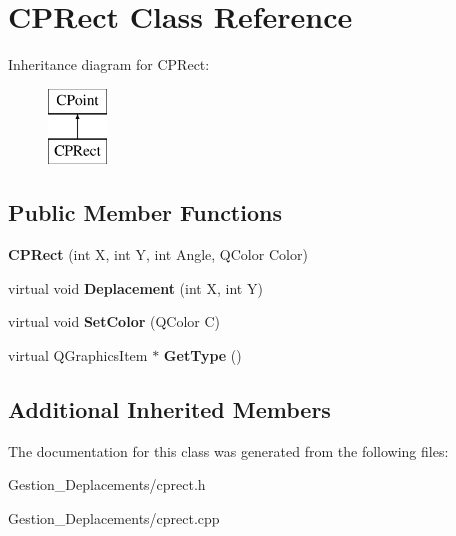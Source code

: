 \section{C\-P\-Rect Class Reference}
\label{class_c_p_rect}
Inheritance diagram for C\-P\-Rect\-:\begin{figure}[H]
\begin{center}
\leavevmode
\includegraphics[height=2.000000cm]{class_c_p_rect}
\end{center}
\end{figure}
\subsection*{Public Member Functions}
\begin{DoxyCompactItemize}
\item 
{\bfseries C\-P\-Rect} (int X, int Y, int Angle, Q\-Color Color)\label{class_c_p_rect_a4fe959025240ac344d98dbfc01ed2ac0}

\item 
virtual void {\bfseries Deplacement} (int X, int Y)\label{class_c_p_rect_a72c14444cb2101761748a5b224834813}

\item 
virtual void {\bfseries Set\-Color} (Q\-Color C)\label{class_c_p_rect_a92a2b116e3b8ee6cb2b34a16a6f6cb3a}

\item 
virtual Q\-Graphics\-Item $\ast$ {\bfseries Get\-Type} ()\label{class_c_p_rect_abb8eb3cd2d131d549d02f9fdb87a47b1}

\end{DoxyCompactItemize}
\subsection*{Additional Inherited Members}


The documentation for this class was generated from the following files\-:\begin{DoxyCompactItemize}
\item 
Gestion\-\_\-\-Deplacements/cprect.\-h\item 
Gestion\-\_\-\-Deplacements/cprect.\-cpp\end{DoxyCompactItemize}
